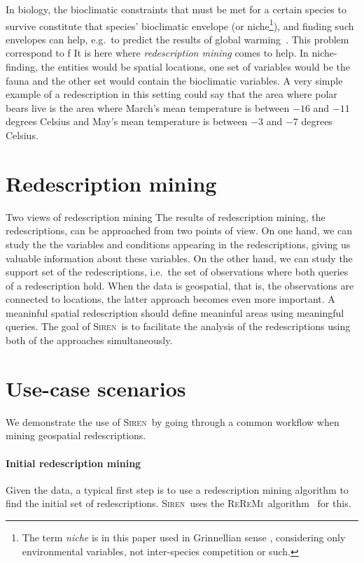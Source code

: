\documentclass{sig-alternate}
\newcommand{\note}[1]{{\color{red}#1}}
\newcommand{\Siren}{\textsc{Siren}}
\newcommand{\ReReMi}{\textsc{ReReMi}}
\begin{document}
In biology, the bioclimatic constraints that must be met 
for a certain species to survive constitute that species' bioclimatic envelope
(or niche\footnote{The term \emph{niche} is in this paper used in Grinnellian
sense \cite{grinnell17niche}, considering only environmental variables, not 
inter-species competition or such.}),
and finding such envelopes can help, e.g.\ to predict the results of 
global warming~\cite{pearson03predicting}.
This problem correspond to f
It is here where \emph{redescription mining} comes to help.  In niche-finding, the entities
would be spatial locations, one set of variables would be the fauna
and the other set would contain the bioclimatic variables. A very
simple example of a redescription in this setting could say that the
area where polar bears live is the area where March's mean temperature
is between $-16$ and $-11$ degrees Celsius and May's mean temperature
is between $-3$ and $-7$ degrees Celsius.




\section{Redescription mining}

\note{Two views of redescription mining}
The results of redescription mining, the redescriptions, can be
approached from two points of view. On one hand, we can study the the
variables and conditions appearing in the redescriptions, giving us
valuable information about these variables. On the other hand, we can
study the support set of the redescriptions, i.e.\ the set of
observations where both queries of a redescription hold. When the data
is geospatial, that is, the observations are connected to locations, the
latter approach becomes even more important. A meaninful spatial
redescription should define meaninful areas using meaningful
queries. The goal of \Siren\ is to facilitate the analysis of the
redescriptions using both of the approaches simultaneously.

\section{Use-case scenarios}
\label{sec:scenarios}

We demonstrate the use of \Siren\ by going through a common workflow
when mining geospatial redescriptions.

\paragraph{Initial redescription mining}
Given the data, a typical first step is to use a redescription mining
algorithm to find the initial set of redescriptions. \Siren\ uses the
\ReReMi\ algorithm~\cite{galbrun11black} for this. 
\end{document}
